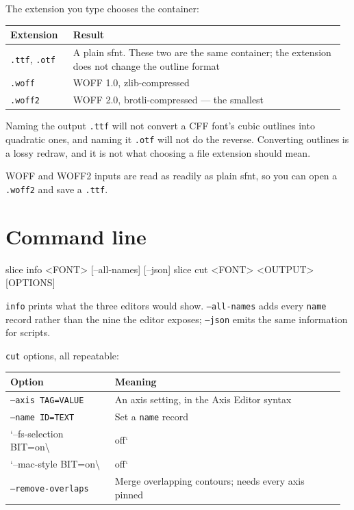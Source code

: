 \documentclass[11pt,a4paper]{article}
\begin{document}
The extension you type chooses the container:

\begin{longtable}{>{\RaggedRight\arraybackslash}p{0.18351351351351353\linewidth}>{\RaggedRight\arraybackslash}p{0.7864864864864864\linewidth}}
\toprule
\textbf{Extension} & \textbf{Result} \\
\midrule\endhead
\texttt{.ttf}, \texttt{.otf} & A plain sfnt. These two are the same container; the extension does not change the outline format \\
\texttt{.woff} & WOFF 1.0, zlib-compressed \\
\texttt{.woff2} & WOFF 2.0, brotli-compressed --- the smallest \\
\bottomrule
\end{longtable}

Naming the output \texttt{.ttf} will not convert a CFF font's cubic outlines into quadratic ones, and naming it \texttt{.otf} will not do the reverse. Converting outlines is a lossy redraw, and it is not what choosing a file extension should mean.

WOFF and WOFF2 inputs are read as readily as plain sfnt, so you can open a \texttt{.woff2} and save a \texttt{.ttf}.

\section{Command line}

\begin{code}
slice info <FONT> [--all-names] [--json]
slice cut  <FONT> <OUTPUT> [OPTIONS]
\end{code}

\texttt{info} prints what the three editors would show. \texttt{--all-names} adds every \texttt{name} record rather than the nine the editor exposes; \texttt{--json} emits the same information for scripts.

\texttt{cut} options, all repeatable:

\begin{longtable}{>{\RaggedRight\arraybackslash}p{0.30148648648648646\linewidth}>{\RaggedRight\arraybackslash}p{0.6685135135135135\linewidth}}
\toprule
\textbf{Option} & \textbf{Meaning} \\
\midrule\endhead
\texttt{--axis TAG=VALUE} & An axis setting, in the Axis Editor syntax \\
\texttt{--name ID=TEXT} & Set a \texttt{name} record \\
`--fs-selection BIT=on\textbackslash{} & off` \\
`--mac-style BIT=on\textbackslash{} & off` \\
\texttt{--remove-overlaps} & Merge overlapping contours; needs every axis pinned \\
\bottomrule
\end{longtable}
\end{document}
